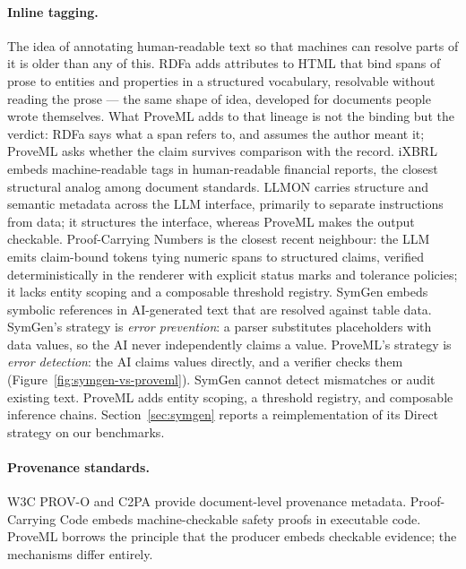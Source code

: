 \documentclass[11pt,a4paper]{article}
\begin{document}
\paragraph{Inline tagging.} The idea of annotating human-readable text so that machines can resolve parts of it is older than any of this. RDFa \citep{rdfa} adds attributes to HTML that bind spans of prose to entities and properties in a structured vocabulary, resolvable without reading the prose --- the same shape of idea, developed for documents people wrote themselves. What ProveML adds to that lineage is not the binding but the verdict: RDFa says what a span refers to, and assumes the author meant it; ProveML asks whether the claim survives comparison with the record. iXBRL \citep{ixbrl} embeds machine-readable tags in human-readable financial reports, the closest structural analog among document standards. LLMON \citep{llmon} carries structure and semantic metadata across the LLM interface, primarily to separate instructions from data; it structures the interface, whereas ProveML makes the output checkable. Proof-Carrying Numbers \citep{pcn2025} is the closest recent neighbour: the LLM emits claim-bound tokens tying numeric spans to structured claims, verified deterministically in the renderer with explicit status marks and tolerance policies; it lacks entity scoping and a composable threshold registry. SymGen \citep{symgen} embeds symbolic references in AI-generated text that are resolved against table data. SymGen's strategy is \textit{error prevention}: a parser substitutes placeholders with data values, so the AI never independently claims a value. ProveML's strategy is \textit{error detection}: the AI claims values directly, and a verifier checks them (Figure~\ref{fig:symgen-vs-proveml}). SymGen cannot detect mismatches or audit existing text. ProveML adds entity scoping, a threshold registry, and composable inference chains. Section~\ref{sec:symgen} reports a reimplementation of its Direct strategy on our benchmarks.

\paragraph{Provenance standards.} W3C PROV-O \citep{prov} and C2PA \citep{c2pa} provide document-level provenance metadata. Proof-Carrying Code \citep{pcc} embeds machine-checkable safety proofs in executable code. ProveML borrows the principle that the producer embeds checkable evidence; the mechanisms differ entirely.
\end{document}
